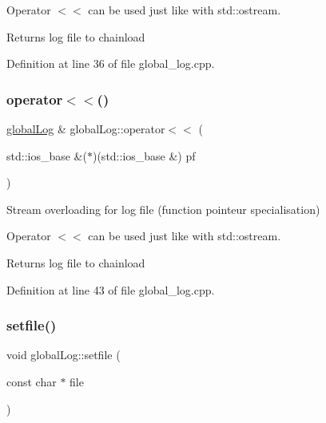 Operator $<$$<$ can be used just like with std\+::ostream.

\begin{DoxyReturn}{Returns}
log file to chainload 
\end{DoxyReturn}


Definition at line 36 of file global\+\_\+log.\+cpp.

\hypertarget{classglobal_log_a390c36e15e827bcd6d10a66a9b882cae}{}\label{classglobal_log_a390c36e15e827bcd6d10a66a9b882cae} 
\subsubsection{\texorpdfstring{operator$<$$<$()}{operator<<()}\hspace{0.1cm}{\footnotesize\ttfamily [4/4]}}
{\footnotesize\ttfamily \hyperlink{classglobal_log}{global\+Log} \& global\+Log\+::operator$<$$<$ (\begin{DoxyParamCaption}\item[{std\+::ios\+\_\+base \&($\ast$)(std\+::ios\+\_\+base \&)}]{pf }\end{DoxyParamCaption})}



Stream overloading for log file (function pointeur specialisation) 

Operator $<$$<$ can be used just like with std\+::ostream.

\begin{DoxyReturn}{Returns}
log file to chainload 
\end{DoxyReturn}


Definition at line 43 of file global\+\_\+log.\+cpp.

\hypertarget{classglobal_log_aef6cc5f9b3bec75f838d7721397b9338}{}\label{classglobal_log_aef6cc5f9b3bec75f838d7721397b9338} 
\subsubsection{\texorpdfstring{setfile()}{setfile()}}
{\footnotesize\ttfamily void global\+Log\+::setfile (\begin{DoxyParamCaption}\item[{const char $\ast$}]{file }\end{DoxyParamCaption})}



